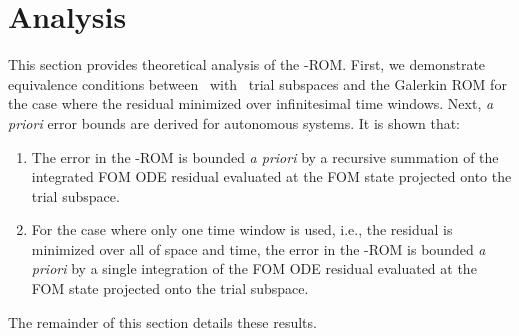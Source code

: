 \section{Analysis}\label{sec:analysis}
This section provides theoretical analysis of the \methodAcronym-ROM. First, we demonstrate equivalence conditions 
between \methodAcronym\  with \spatialAcronym\ trial subspaces and the Galerkin ROM for the case where the residual minimized over infinitesimal time windows.
Next, \textit{a priori} error bounds are derived for autonomous systems. It is shown that:
\begin{enumerate}
\item The error in the \methodAcronym-ROM is bounded \textit{a priori} by a recursive summation of the integrated FOM ODE residual evaluated at the FOM state projected onto the trial subspace. 
\item For the case where only 
one time window is used, i.e., the residual is minimized over all of space and time, the error in the \methodAcronym-ROM is bounded \textit{a priori} by a single 
integration of the FOM ODE residual evaluated at the FOM state projected onto the trial subspace. 
\end{enumerate}
The remainder of this section details these results. 

